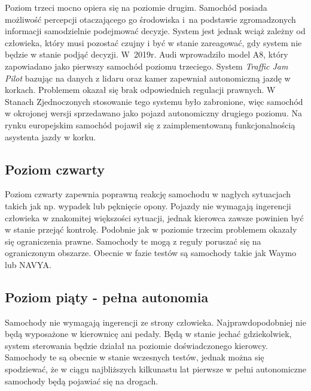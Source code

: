 Poziom trzeci mocno opiera się na poziomie drugim. %
Samochód posiada możliwość percepcji otaczającego go środowiska i~na podstawie zgromadzonych informacji samodzielnie podejmować decyzje. %
System jest jednak wciąż zależny od człowieka, który musi pozostać czujny i być w stanie zareagować, gdy system nie będzie w stanie podjąć decyzji. 
W~2019r. Audi wprowadziło model A8, który zapowiadano jako pierwszy samochód poziomu trzeciego. 
System \textit{Traffic Jam Pilot} bazując na danych z lidaru oraz kamer zapewniał autonomiczną jazdę w korkach. 
Problemem okazał się brak odpowiednich regulacji prawnych. %
W Stanach Zjednoczonych stosowanie tego systemu było zabronione, więc samochód w okrojonej wersji sprzedawano jako pojazd autonomiczny drugiego poziomu. 
Na rynku europejskim samochód pojawił się z zaimplementowaną funkcjonalnością asystenta jazdy w korku. %

\subsection{Poziom czwarty}

Poziom czwarty zapewnia poprawną reakcję samochodu w nagłych sytuacjach takich jak np. wypadek lub pęknięcie opony. %
Pojazdy nie wymagają ingerencji człowieka w znakomitej większości sytuacji, jednak kierowca zawsze powinien być w stanie przejąć kontrolę. 
Podobnie jak w poziomie trzecim problemem okazały się ograniczenia prawne. 
Samochody te mogą z reguły poruszać się na ograniczonym obszarze. 
Obecnie w fazie testów są samochody takie jak Waymo lub NAVYA.

\subsection{Poziom piąty - pełna autonomia}
Samochody nie wymagają ingerencji ze strony człowieka. 
Najprawdopodobniej nie będą wyposażone w kierownicę ani pedały. 
Będą w stanie jechać gdziekolwiek, system sterowania będzie działał na poziomie doświadczonego kierowcy. 
Samochody te są obecnie w stanie wczesnych testów, jednak można się spodziewać, że w ciągu najbliższych kilkunastu lat pierwsze w pełni autonomiczne samochody będą pojawiać się na drogach.

